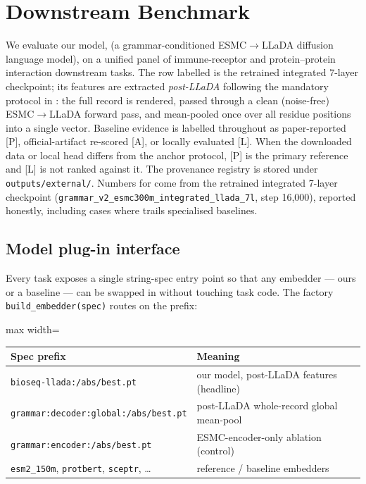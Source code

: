 \section{Downstream Benchmark}
\label{sec:experiments}

We evaluate our model, \Ours{} (a grammar-conditioned ESMC$\rightarrow$LLaDA
diffusion language model), on a unified panel of immune-receptor and
protein--protein interaction downstream tasks. The row labelled \OursCkpt{} is
the retrained integrated 7-layer checkpoint; its features are extracted
\emph{post-LLaDA} following the mandatory protocol in : the
full record is rendered, passed through a clean (noise-free)
ESMC$\rightarrow$LLaDA forward pass, and mean-pooled once over all residue
positions into a single vector. Baseline evidence is labelled throughout as
paper-reported [P], official-artifact re-scored [A], or locally evaluated [L].
When the downloaded data or local head differs from the anchor protocol, [P]
is the primary reference and [L] is not ranked against it. The provenance
registry is stored under \texttt{outputs/external/}. Numbers for \OursCkpt{}
come from the retrained integrated
7-layer checkpoint
(\texttt{grammar\_v2\_esmc300m\_integrated\_llada\_7l}, step 16{,}000),
reported honestly, including cases where \Ours{} trails specialised baselines.

\subsection{Model plug-in interface}
\label{sec:interface}

Every task exposes a single string-spec entry point so that any embedder ---
ours or a baseline --- can be swapped in without touching task code. The factory
\texttt{build\_embedder(spec)} routes on the prefix:

\begin{center}
\small
\begin{adjustbox}{max width=\textwidth}
\begin{tabular}{@{}ll@{}}
\toprule
Spec prefix & Meaning \\
\midrule
\texttt{bioseq-llada:/abs/best.pt} & our model, post-LLaDA features (headline) \\
\texttt{grammar:decoder:global:/abs/best.pt} & post-LLaDA whole-record global mean-pool \\
\texttt{grammar:encoder:/abs/best.pt} & ESMC-encoder-only ablation (control) \\
\texttt{esm2\_150m}, \texttt{protbert}, \texttt{sceptr}, \dots & reference / baseline embedders \\
\bottomrule
\end{tabular}
\end{adjustbox}
\end{center}

